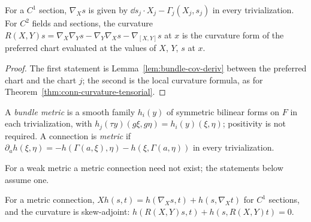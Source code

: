 \begin{theorem}
  \label{thm:bundle-cov-deriv-global}
  \leanok
  For a $C^1$ section, $\nabla_X s$ is given by $\dd s_j \cdot X_j - \Gamma_j(X_j, s_j)$ in
  every trivialization. For $C^2$ fields and sections, the curvature
  $R(X, Y)s = \nabla_X\nabla_Y s - \nabla_Y\nabla_X s - \nabla_{[X, Y]} s$ at $x$ is the
  curvature form of the preferred chart evaluated at the values of $X$, $Y$, $s$ at $x$.
\end{theorem}

\begin{proof}
  \leanok
  The first statement is Lemma~\ref{lem:bundle-cov-deriv} between the preferred chart and the
  chart $j$; the second is the local curvature formula, as for Theorem~\ref{thm:conn-curvature-tensorial}.
\end{proof}

\begin{definition}
  \label{def:bundle-metric}
  \leanok
  A \emph{bundle metric} is a smooth family $h_i(y)$ of symmetric bilinear forms on $F$ in each
  trivialization, with $h_j(\tau y)(g\xi, g\eta) = h_i(y)(\xi, \eta)$; positivity is not
  required. A connection is \emph{metric} if
  $\partial_a h(\xi, \eta) = -h(\Gamma(a, \xi), \eta) - h(\xi, \Gamma(a, \eta))$ in every
  trivialization.
\end{definition}

For a weak metric a metric connection need not exist; the statements below assume one.

\begin{theorem}
  \label{thm:metric-connections}
  \leanok
  For a metric connection, $X h(s, t) = h(\nabla_X s, t) + h(s, \nabla_X t)$ for $C^1$
  sections, and the curvature is skew-adjoint:
  $h(R(X, Y)s, t) + h(s, R(X, Y)t) = 0$.
\end{theorem}

